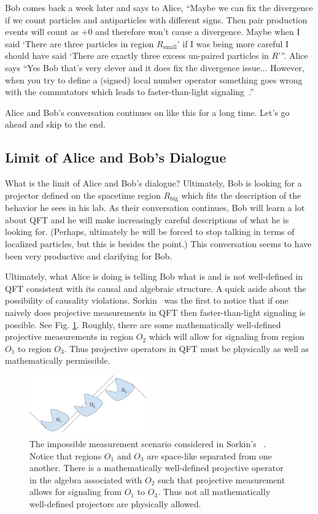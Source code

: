 \documentclass[12pt,prd,superscriptaddress,floatfix,amsmath,amssymb,amsfonts,nofootinbib]{revtex4-2}
\begin{document}
Bob comes back a week later and says to Alice, ``Maybe we can fix the divergence if we count particles and antiparticles with different signs. Then pair production events will count as +0 and therefore won't cause a divergence. Maybe when I said `There are three particles in region $R_\text{small}$' if I was being more careful I should have said `There are exactly three excess un-paired particles in $R$'''.  Alice says ``Yes Bob that's very clever and it does fix the divergence issue...  However, when you try to define a (signed) local number operator something goes wrong with the commutators which leads to faster-than-light signaling~\cite{Redhead1995}.''
 
Alice and Bob's conversation continues on like this for a long time. Let's go ahead and skip to the end.

\subsection{Limit of Alice and Bob's Dialogue}
What is the limit of Alice and Bob's dialogue? Ultimately, Bob is looking for a projector defined on the spacetime region $R_\text{big}$ which fits the description of the behavior he sees in his lab. As their conversation continues, Bob will learn a lot about QFT and he will make increasingly careful descriptions of what he is looking for. (Perhaps, ultimately he will be forced to stop talking in terms of localized particles, but this is besides the point.) This conversation seems to have been very productive and clarifying for Bob.

Ultimately, what Alice is doing is telling Bob what is and is not well-defined in QFT consistent with its causal and algebraic structure. A quick aside about the possibility of causality violations. Sorkin~\cite{Sorkin} was the first to notice that if one naively does projective measurements in QFT then faster-than-light signaling is possible. See Fig. \ref{FigSorkin}. Roughly, there are some mathematically well-defined projective measurements in region $O_2$ which will allow for signaling from region $O_1$ to region $O_3$. Thus projective operators in QFT must be physically as well as mathematically permissible.  
\begin{figure}
\includegraphics[width=0.45\textwidth]{Figures/SorkinDiagram.pdf}
\caption{The impossible measurement scenario considered in Sorkin's ~\cite{Sorkin}. Notice that regions $O_1$ and $O_3$ are space-like separated from one another. There is a mathematically well-defined projective operator in the algebra associated with $O_2$ such that projective measurement allows for signaling from $O_1$ to $O_3$. Thus not all mathematically well-defined projectors are physically allowed.}\label{FigSorkin}
\end{figure}
\end{document}
